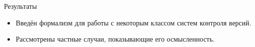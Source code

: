 \begin{frame}{Результаты}
  \begin{itemize}
  \item Введён формализм для работы с некоторым классом систем
    контроля версий.
  \item Рассмотрены частные случаи, показывающие его осмысленность.
  \end{itemize}
\end{frame}
